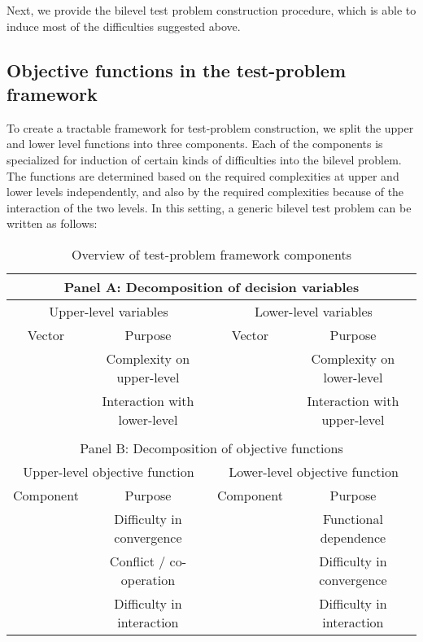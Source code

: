 \documentclass[twoside]{article}
\begin{document}
Next, we provide the bilevel test problem construction procedure, which is able to induce most of the difficulties suggested above.

\subsection{Objective functions in the test-problem framework}

To create a tractable framework for test-problem construction, we split the upper and lower level functions into three components. Each of the components is specialized for induction of certain kinds of difficulties into the bilevel problem. The functions are determined based on the required complexities at upper and lower levels independently, and also by the required complexities because of the interaction of the two levels. In this setting, a generic bilevel test problem can be written as follows:



\begin{table*}
\caption{Overview of test-problem framework components}\label{tab:framework}
\begin{minipage}{1.0\linewidth}
\begin{footnotesize}
\begin{center}
\begin{tabular}{|c|c|c|c|}
\multicolumn{4}{c}{Panel A: Decomposition of decision variables}\\
\hline
\multicolumn{2}{|c|}{Upper-level variables} & \multicolumn{2}{|c|}{Lower-level variables} \\
\hline
Vector & Purpose & Vector & Purpose \\
\hline\hline
 & Complexity on upper-level &  & Complexity on lower-level \\
 & Interaction with lower-level &  & Interaction with upper-level \\
\hline

\multicolumn{4}{c}{}\\

\multicolumn{4}{c}{Panel B: Decomposition of objective functions}\\
\hline
\multicolumn{2}{|c|}{Upper-level objective function} & \multicolumn{2}{|c|}{Lower-level objective function} \\
\hline
Component & Purpose & Component & Purpose \\
\hline\hline
 & Difficulty in convergence &  & Functional dependence \\
 & Conflict / co-operation &  & Difficulty in convergence\\
 & Difficulty in interaction &  & Difficulty in interaction \\
\hline
\end{tabular}
\end{center}
\end{footnotesize}
\end{minipage}
\end{table*}
\end{document}
